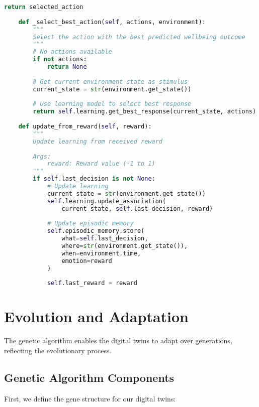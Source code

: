 \documentclass[11pt,a4paper]{article}
\begin{document}
\begin{lstlisting}[language=Python]
        return selected_action
        
    def _select_best_action(self, actions, environment):
        """
        Select the action with the best predicted wellbeing outcome
        """
        # No actions available
        if not actions:
            return None
            
        # Get current environment state as stimulus
        current_state = str(environment.get_state())
        
        # Use learning model to select best response
        return self.learning.get_best_response(current_state, actions)
        
    def update_from_reward(self, reward):
        """
        Update learning from received reward
        
        Args:
            reward: Reward value (-1 to 1)
        """
        if self.last_decision is not None:
            # Update learning
            current_state = str(environment.get_state())
            self.learning.update_association(
                current_state, self.last_decision, reward)
            
            # Update episodic memory
            self.episodic_memory.store(
                what=self.last_decision,
                where=str(environment.get_state()),
                when=environment.time,
                emotion=reward
            )
            
            self.last_reward = reward
\end{lstlisting}

\section{Evolution and Adaptation}
The genetic algorithm enables the digital twins to adapt over generations, reflecting the evolutionary process.

\subsection{Genetic Algorithm Components}
First, we define the gene structure for our digital twins:
\end{document}
